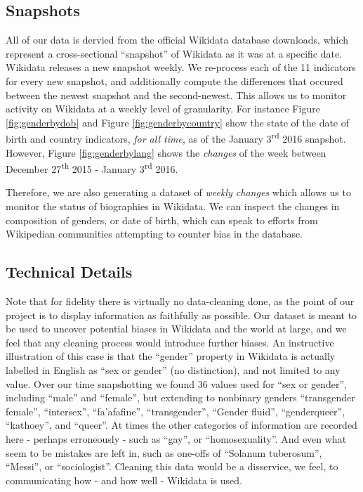 \documentclass{sig-alternate-05-2015}
\begin{document}
\subsection{Snapshots}
All of our data is dervied from the official Wikidata database downloads, which represent a cross-sectional ``snapshot'' of Wikidata as it was at a specific date. Wikidata releases a new snapshot weekly. We re-process each of the 11 indicators for every new snapshot, and additionally compute the differences that occured between the newest snapshot and the second-newest. This allows us to monitor activity on Wikidata at a weekly level of granularity. For instance Figure  \ref{fig:genderbydob} and Figure \ref{fig:genderbycountry} show the state of the date of birth and country indicators, \textit{for all time}, as of the January 3\textsuperscript{rd} 2016 snapshot. However, Figure \ref{fig:genderbylang} shows the \textit{changes} of the week between December 27\textsuperscript{th} 2015 - January 3\textsuperscript{rd} 2016.

Therefore, we are also generating a dataset of \textit{weekly changes} which allows us to monitor the status of biographies in Wikidata. We can inspect the changes in composition of genders, or date of birth, which can speak to efforts from Wikipedian communities attempting to counter bias in the database.

\subsection{Technical Details}

Note that for fidelity there is virtually no data-cleaning done, as the point of our project is to display information as faithfully as possible. Our dataset is meant to be used to uncover potential biases in Wikidata and the world at large, and we feel that any cleaning process would introduce further biases. An instructive illustration of this case is that the ``gender'' property in Wikidata is actually labelled in English  as ``sex or gender'' (no distinction), and not limited to any value. Over our time snapshotting we found 36 values used for ``sex or gender'', including ``male'' and ``female'', but extending to nonbinary genders ``transgender female'', ``intersex'', ``fa'afafine'', ``transgender'', ``Gender fluid'',  ``genderqueer'', ``kathoey'', and ``queer''. At times the other categories of information are recorded here - perhaps erroneously - such as ``gay'', or ``homosexuality''. And even what seem to be mistakes are left in, such as one-offs of ``Solanum tuberosum'', ``Messi'', or ``sociologist''. Cleaning this data would be a disservice, we feel, to communicating how - and how well - Wikidata is used.
\end{document}
